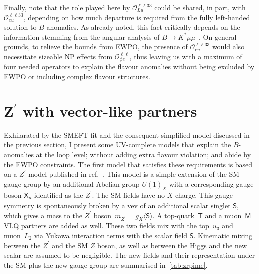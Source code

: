 Finally, note that the role played here by $\mathcal{O}_{Lu}^{\ell \ell 3 3}$ could be shared, in part, with $\mathcal{O}_{eu}^{\ell \ell 3 3}$, depending on how much departure is required from the fully left-handed solution to $B$ anomalies. As already noted, this fact critically depends on the information stemming from the angular analysis of $B \to K^{*} \mu \mu$~\cite{Ciuchini:2019usw}. On general grounds, to relieve the bounds from EWPO, the presence of $\mathcal{O}_{eu}^{\ell \ell 3 3}$ would also necessitate sizeable NP effects from $\mathcal{O}_{\phi e}^{\ell \ell}$, thus leaving us with a maximum of four needed operators to explain the flavour anomalies without being excluded by EWPO or including complex flavour structures.
\section{\texorpdfstring{Z$^{\prime}$}{Z'} with vector-like partners}
\label{sec:mod_Zprime}
Exhilarated by the SMEFT fit and the consequent simplified model discussed in the previous section, I present some UV-complete models that explain the $B$-anomalies at the loop level; without adding extra flavour violation; and abide by the EWPO constraints.   The first model that satisfies these requirements is based on a $Z^\prime$ model published in ref.~\cite{Kamenik:2017tnu}.  This model is a simple extension of the SM gauge group by an additional Abelian group $U(1)_X$ with a corresponding gauge boson $\mathsf{X}_{\mu}$ identified as the $Z^\prime$. The SM fields have no $X$ charge. This gauge symmetry is spontaneously broken by a vev of an additional scalar singlet $\mathsf{S}$, which gives a mass to the $Z^\prime$ boson~$m_{Z^{\prime}} = g_{X} \langle \mathsf{S} \rangle $. A top-quark~$\mathsf{T}$ and a muon~$\mathsf{M}$ VLQ partners are added as well. These two fields mix with the top~$u_3$ and muon~$L_2$ via Yukawa interaction terms with the scalar field $\mathsf S$. Kinematic mixing between the $Z^\prime$ and the SM $Z$ boson, as well as between the Higgs and the new scalar are assumed to be negligible. The new fields and their representation under the SM plus the new gauge group are summarised in~\autoref{tab:zrpime}. 
